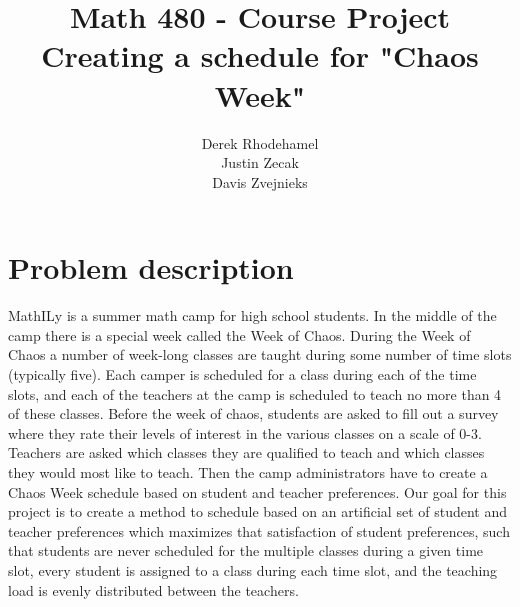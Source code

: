 \documentclass[11pt]{article}
\title{\textbf{Math 480 - Course Project}
			  \\Creating a schedule for "Chaos Week"}
\author{Derek Rhodehamel\\
		Justin Zecak\\
		Davis Zvejnieks}
\date{}
\begin{document}
\maketitle

\section{Problem description}
MathILy is a summer math camp for high school students.  In the middle of the camp there is a special week called the Week of Chaos.  During the Week of Chaos a number of week-long classes are taught during some number of time slots (typically five). Each camper is scheduled for a class during each of the time slots, and each of the teachers at the camp is scheduled to teach no more than 4 of these classes.  Before the week of chaos, students are asked to fill out a survey where they rate their levels of interest in the various classes on a scale of 0-3. Teachers are asked which classes they are qualified to teach and which classes they would most like to teach. Then the camp administrators have to create a Chaos Week schedule based on student and teacher preferences. Our goal for this project is to create a method to schedule based on an artificial set of student and teacher preferences which maximizes that satisfaction of student preferences, such that students are never scheduled for the multiple classes during a given time slot, every student is assigned to a class during each time slot, and the teaching load is evenly distributed between the teachers.
\end{document}
